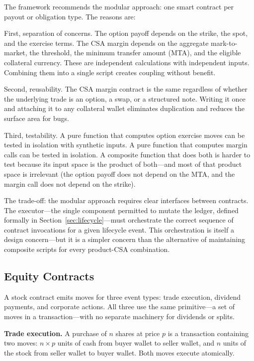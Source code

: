 \documentclass[11pt,a4paper]{article}
\begin{document}
The framework recommends the modular approach: one smart contract per payout or obligation type. The reasons are:

First, separation of concerns. The option payoff depends on the strike, the spot, and the exercise terms. The CSA margin depends on the aggregate mark-to-market, the threshold, the minimum transfer amount (MTA), and the eligible collateral currency. These are independent calculations with independent inputs. Combining them into a single script creates coupling without benefit.

Second, reusability. The CSA margin contract is the same regardless of whether the underlying trade is an option, a swap, or a structured note. Writing it once and attaching it to any collateral wallet eliminates duplication and reduces the surface area for bugs.

Third, testability. A pure function that computes option exercise moves can be tested in isolation with synthetic inputs. A pure function that computes margin calls can be tested in isolation. A composite function that does both is harder to test because its input space is the product of both---and most of that product space is irrelevant (the option payoff does not depend on the MTA, and the margin call does not depend on the strike).

The trade-off: the modular approach requires clear interfaces between contracts. The executor---the single component permitted to mutate the ledger, defined formally in Section~\ref{sec:lifecycle}---must orchestrate the correct sequence of contract invocations for a given lifecycle event. This orchestration is itself a design concern---but it is a simpler concern than the alternative of maintaining composite scripts for every product-CSA combination.

\subsection{Equity Contracts}

A stock contract emits moves for three event types: trade execution, dividend payments, and corporate actions. All three use the same primitive---a set of moves in a transaction---with no separate machinery for dividends or splits.

\noindent\textbf{Trade execution.} A purchase of $n$ shares at price $p$ is a transaction containing two moves: $n \times p$ units of cash from buyer wallet to seller wallet, and $n$ units of the stock from seller wallet to buyer wallet. Both moves execute atomically.
\end{document}
